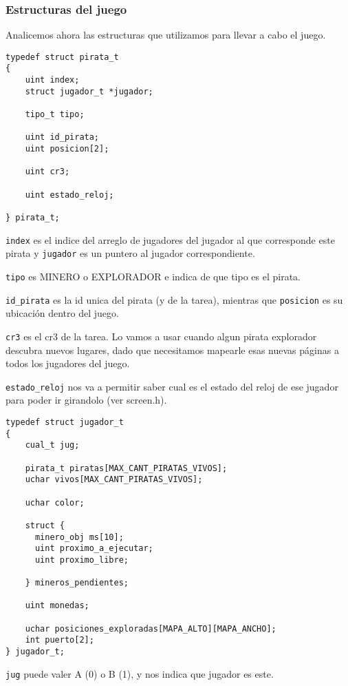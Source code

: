 \subsubsection*{Estructuras del juego}

Analicemos ahora las estructuras que utilizamos para llevar a cabo el juego.


\begin{lstlisting}
typedef struct pirata_t
{
    uint index;
    struct jugador_t *jugador;
    
    tipo_t tipo;
    
    uint id_pirata;
    uint posicion[2];
    
    uint cr3;

    uint estado_reloj;

} pirata_t;
\end{lstlisting}

\texttt{index} es el indice del arreglo de jugadores del jugador al que corresponde este pirata y \texttt{jugador} es un puntero al jugador correspondiente.

\texttt{tipo} es MINERO o EXPLORADOR e indica de que tipo es el pirata.

\texttt{id_pirata} es la id unica del pirata (y de la tarea), mientras que \texttt{posicion} es su ubicación dentro del juego.

\texttt{cr3} es el cr3 de la tarea. Lo vamos a usar cuando algun pirata explorador descubra nuevos lugares, dado que necesitamos mapearle esas nuevas páginas a todos los jugadores del juego.

\texttt{estado_reloj} nos va a permitir saber cual es el estado del reloj de ese jugador para poder ir girandolo (ver screen.h).


\begin{lstlisting}
typedef struct jugador_t
{
    cual_t jug;
    
    pirata_t piratas[MAX_CANT_PIRATAS_VIVOS];
    uchar vivos[MAX_CANT_PIRATAS_VIVOS];
    
    uchar color;

    struct {
      minero_obj ms[10]; 
      uint proximo_a_ejecutar;
      uint proximo_libre;
      
    } mineros_pendientes;
 
    uint monedas;
  
    uchar posiciones_exploradas[MAPA_ALTO][MAPA_ANCHO];
    int puerto[2];   
} jugador_t;
\end{lstlisting}

\texttt{jug} puede valer A (0) o B (1), y nos indica que jugador es este.

